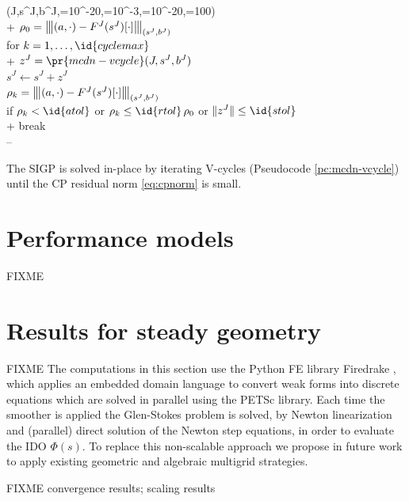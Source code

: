 \documentclass[letterpaper,final,12pt,reqno]{amsart}
\theoremstyle{claim}
\newcommand{\vertiii}[1]{{\left\vert\kern-0.25ex\left\vert\kern-0.25ex\left\vert #1 \right\vert\kern-0.25ex\right\vert\kern-0.25ex\right\vert}}
\numberwithin{equation}{section}
\numberwithin{figure}{section}
\numberwithin{table}{section}
\numberwithin{theorem}{section}
\begin{document}
\begin{pcode}[ht]
\begin{pseudo*}
(J,s^J,b^J,=10^{-20},=10^{-3},=10^{-20},=100)\text{:} \\+
    $\rho_0=\vertiii{(a,\cdot) - F^J(s^J)[\cdot]}_{(s^J,b^J)}$ \\
    for $k=1,\dots,\id{cyclemax}$ \\+
        $z^J = \pr{mcdn-vcycle}(J,s^J,b^J)$ \\
        $s^J \gets s^J + z^J$ \\
        $\rho_k=\vertiii{(a,\cdot) - F^J(s^J)[\cdot]}_{(s^J,b^J)}$ \\
        if $\rho_k < \id{atol}$ or $\rho_k \le \id{rtol} \, \rho_0$ or $\|z^J\| \le \id{stol}$ \\+
            break \\--
\end{pseudo*}
\caption{The SIGP is solved in-place by iterating V-cycles (Pseudocode \ref{pc:mcdn-vcycle}) until the CP residual norm \eqref{eq:cpnorm} is small.}
\label{pc:mcdn-solver}
\end{pcode}


\section{Performance models} \label{sec:perfmodels}

FIXME


\section{Results for steady geometry} \label{sec:results}

FIXME The computations in this section use the Python FE library Firedrake \cite{Rathgeberetal2016}, which applies an embedded domain language \cite{Alnaesetal2014} to convert weak forms into discrete equations which are solved in parallel using the PETSc \cite{Balayetal2020} library.  Each time the smoother is applied the Glen-Stokes problem is solved, by Newton linearization and (parallel) direct solution of the Newton step equations, in order to evaluate the IDO $\Phi(s)$.  To replace this non-scalable approach we propose in future work to apply existing geometric \cite{BrownSmithAhmadia2013,IsaacStadlerGhattas2015} and algebraic \cite{Tuminaroetal2016} multigrid strategies.

FIXME convergence results; scaling results
\end{document}
